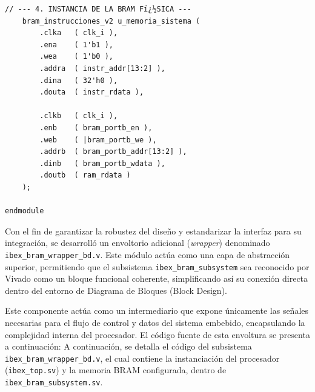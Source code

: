 \begin{lstlisting}[style=verilogstyle, basicstyle=\ttfamily\footnotesize, caption={Codigo fuente del subsistema \texttt{ibex\_bram\_subsystem.sv}}, label={code:ibex_bram_subsystem}]
    // --- 4. INSTANCIA DE LA BRAM Fï¿½SICA ---
    bram_instrucciones_v2 u_memoria_sistema (
        .clka   ( clk_i ),
        .ena    ( 1'b1 ),
        .wea    ( 1'b0 ),
        .addra  ( instr_addr[13:2] ),
        .dina   ( 32'h0 ),
        .douta  ( instr_rdata ),

        .clkb   ( clk_i ),
        .enb    ( bram_portb_en ),
        .web    ( |bram_portb_we ),
        .addrb  ( bram_portb_addr[13:2] ),
        .dinb   ( bram_portb_wdata ),
        .doutb  ( ram_rdata )
    );

endmodule
\end{lstlisting}

Con el fin de garantizar la robustez del diseño y estandarizar la interfaz para su integración, se desarrolló un envoltorio adicional (\textit{wrapper}) denominado \texttt{ibex\_bram\_wrapper\_bd.v}. Este módulo actúa como una capa de abstracción superior, permitiendo que el subsistema \texttt{ibex\_bram\_subsystem} sea reconocido por Vivado como un bloque funcional coherente, simplificando así su conexión directa dentro del entorno de Diagrama de Bloques (Block Design).

Este componente actúa como un intermediario que expone únicamente las señales necesarias para el flujo de control y datos del sistema embebido, encapsulando la complejidad interna del procesador. El código fuente de esta envoltura se presenta a continuación:
A continuación, se detalla el código del subsistema \texttt{ibex\_bram\_wrapper\_bd.v}, el cual contiene la instanciación del procesador (\texttt{ibex\_top.sv}) y la memoria BRAM configurada, dentro de \texttt{ibex\_bram\_subsystem.sv}.

